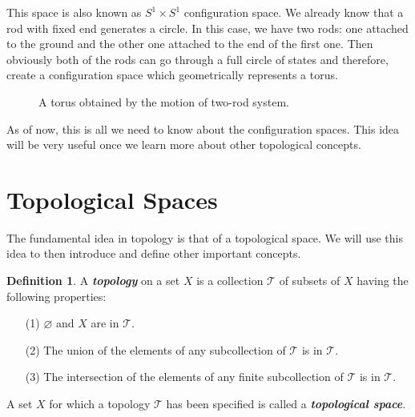 \documentclass[a4paper, twocolumn]{article}
\newcommand{\topology}{\mathcal{T}}              %
\renewcommand{\emptyset}{\varnothing}            %
\theoremstyle{definition}
\newtheorem*{definition}{Definition}
\begin{document}
This space is also known as $S^1 \times S^1$ configuration space.
We already know that a rod with fixed end generates a circle. In this case,
we have two rods: one attached to the ground and the other one attached to the end
of the first one. Then obviously both of the rods can go through a full circle
of states and therefore, create a configuration space which geometrically represents a torus.

\begin{figure}[H]
    \centering
    \caption*{A torus obtained by the motion of two-rod system.}
\end{figure}

As of now, this is all we need to know about the configuration spaces.
This idea will be very useful once we learn more about other topological concepts.


\section*{\centering Topological Spaces}
The fundamental idea in topology is that of a topological space.
We will use this idea to then introduce and define other important concepts.

\begin{definition}
\cite{3} A \textit{\textbf{topology}} on a set $X$ is a collection $\topology$ of subsets of $X$ having
the following properties:

\begin{itemize}
\item[(1)]
$\emptyset$ and $X$ are in $\topology$.

\item[(2)]
The union of the elements of any subcollection of $\topology$ is in $\topology$.

\item[(3)]
The intersection of the elements of any finite subcollection of $\topology$ is in $\topology$.
\end{itemize}

A set $X$ for which a topology $\topology$ has been specified is called a \textit{\textbf{topological space}}.
\end{definition}
\end{document}
